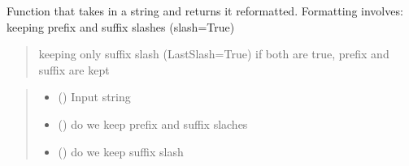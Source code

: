 \documentclass[letterpaper,10pt,english]{sphinxmanual}
\begin{document}
\begin{fulllineitems}
\label{\detokenize{api/killMS.Other:killMS.Other.reformat.reformat}}
\pysigstartsignatures
{}
\pysigstopsignatures
\sphinxAtStartPar
Function that takes in a string and returns it reformatted.
Formatting involves: keeping prefix and suffix slashes (slash=True)
\begin{quote}

\sphinxAtStartPar
keeping only suffix slash (LastSlash=True)
if both are true, prefix and suffix are kept
\end{quote}
\begin{quote}\begin{description}
\begin{itemize}
\item {} 
\sphinxAtStartPar
{} () \textendash{} Input string

\item {} 
\sphinxAtStartPar
{} () \textendash{} do we keep prefix and suffix slaches

\item {} 
\sphinxAtStartPar
{} () \textendash{} do we keep suffix slash

\end{itemize}

\sphinxAtStartPar
{}

\end{description}\end{quote}

\end{fulllineitems}
\end{document}
